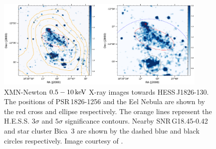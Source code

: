 \begin{table}[h!]
    \caption{Fit parameters to the spectrum of \mbox{HESS\,J1826-130}. Power law (PL): $\dv{N}{E}\propto \qty(\frac{E_p}{E_0})^{-\Gamma}$. Exponential Cutoff Power Law (ECPL): $\dv{N}{E}\propto \qty(\frac{E_p}{E_0})^{-\Gamma}\exp(-\frac{E}{E_c})$. Broken Power Law (BPL): $\dv{N}{E}\propto \qty(\frac{E_p}{E_b})^{-\Gamma}$ where $\Gamma=\Gamma_1$ if $E<E_b$ and $\Gamma=\Gamma_2$ otherwise. $E_0=1\,\TeV$ unless specified.}
    \label{tab:chapter1_1826_parameters}
\end{table}

\begin{figure}[ht]
    \centering
    \includegraphics[width=0.9\textwidth]{04_Introduction/Images/pulsar_wind_nebula/hess_j1826_130_xray.jpg}
    \caption{XMN-Newton $0.5-10\,\si{\kilo\electronvolt}$ X-ray images towards \mbox{HESS\,J1826-130}. The positions of \mbox{PSR\,1826-1256} and the Eel Nebula are shown by the red cross and ellipse respectively. The orange lines represent the H.E.S.S. $3\sigma$ and $5\sigma$ significance contours. Nearby \mbox{SNR\,G18.45-0.42} and star cluster \mbox{Bica 3} are shown by the dashed blue and black circles respectively.  Image courtesy of \cite{2022ApJ...930..148B}.}
    \label{fig:chapter1_hess_j1826_xray}
\end{figure}

